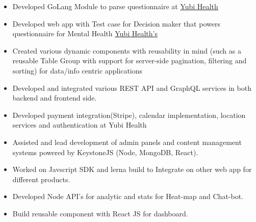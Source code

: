 \documentclass[10pt,a4paper,ragged2e]{maltacv}
\begin{document}
\begin{itemize}
  \item Developed GoLang Module to parse questionnaire at \href{https://yubihealth.com/}{Yubi Health}
  \item Developed web app with Test case for Decision maker that powers questionnaire for Mental Health \href{https://yubihealth.com/}{Yubi Health's}
  \item Created various dynamic components with reusability in mind (such as a reusable Table Group with support for server-side pagination, filtering and sorting) for data/info centric applications
  \item Developed and integrated various REST API and GraphQL services in both backend and frontend side.
  \item Developed payment integration(Stripe), calendar implementation, location services and authentication at Yubi Health
  \item Assisted and lead development of admin panels and content management systems powered by KeystoneJS (Node, MongoDB, React).
\end{itemize}

\divider

\begin{itemize}
  \item Worked on Javscript SDK and lerna build to Integrate on other web app for different products. 
  \item Developed Node API's for analytic and stats for Heat-map and Chat-bot. 
  \item Build reusable component with React JS for dashboard.
\end{itemize}

\divider
\medskip
\end{document}
